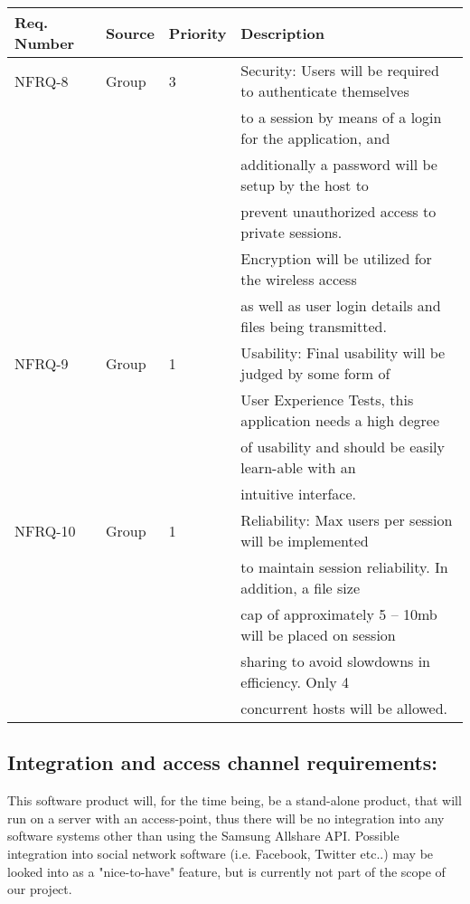 \documentclass[12pt]{article}
\begin{document}
\begin{center} \begin{tabular}[h]{|l|l|l|l|}
\hline
Req. Number & Source & Priority & Description \\
\hline
NFRQ-8 & Group & 3 & Security: Users will be required to authenticate themselves \\ & & & 
					to a session by means of a login for the application, and \\ & & & 
					additionally a password will be setup by the host to\\ & & & 
					 prevent unauthorized access to private sessions. \\ & & & 
					  Encryption will be utilized for the wireless access\\ & & & 
					 as well as user login details and files being transmitted.\\
\hline
NFRQ-9 & Group & 1 & Usability: Final usability will be judged by some form of\\ & & & 
					 User Experience Tests, this application needs a high degree\\ & & & 
					  of usability and should be easily learn-able with an \\ & & & 
					  intuitive interface. \\
\hline
NFRQ-10 & Group & 1 & Reliability: Max users per session will be implemented\\ & & & 
					 to maintain session reliability. In addition, a file size \\ & & & 
					 cap of approximately 5 – 10mb will be placed on session\\ & & & 
					  sharing to avoid slowdowns in efficiency. Only 4 \\ & & & 
					  concurrent hosts will be allowed. \\
\hline
\end{tabular} \end{center}
\newpage
\subsection{Integration and access channel requirements:}
This software product will, for the time being, be a stand-alone product, that will run on a server with an access-point, thus there will be no integration into any software systems other than using the Samsung Allshare API.
Possible integration into social network software (i.e. Facebook, Twitter etc..) may be looked into as a "nice-to-have" feature, but is currently not part of the scope of our project.
\end{document}
